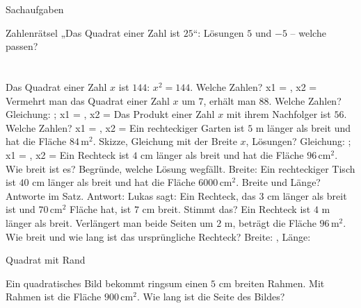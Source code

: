 \setcounter{aufgabe}{20}

\begin{aufgabe}{Sachaufgaben}
\begin{teile}
\teil Zahlenrätsel „Das Quadrat einer Zahl ist $25$“: Lösungen $5$ und $-5$ – welche passen?\\  \\  \\ 
\teil Das Quadrat einer Zahl $x$ ist $144$: $x^2 = 144$. Welche Zahlen? x1 = \leerfeld , x2 = \leerfeld
\teil Vermehrt man das Quadrat einer Zahl $x$ um $7$, erhält man $88$. Welche Zahlen? Gleichung: \leerfeld ; x1 = \leerfeld , x2 = \leerfeld
\teil Das Produkt einer Zahl $x$ mit ihrem Nachfolger ist $56$. Welche Zahlen? x1 = \leerfeld , x2 = \leerfeld
\teil Ein rechteckiger Garten ist $5$ m länger als breit und hat die Fläche $84\,\text{m}^2$. Skizze, Gleichung mit der Breite $x$, Lösungen? Gleichung: \leerfeld ; x1 = \leerfeld , x2 = \leerfeld
\teil Ein Rechteck ist $4$ cm länger als breit und hat die Fläche $96\,\text{cm}^2$. Wie breit ist es? Begründe, welche Lösung wegfällt. Breite: \leerfeld[cm]
\teil Ein rechteckiger Tisch ist $40$ cm länger als breit und hat die Fläche $6000\,\text{cm}^2$. Breite und Länge? Antworte im Satz. Antwort: \leerfeld
\teil Lukas sagt: Ein Rechteck, das $3$ cm länger als breit ist und $70\,\text{cm}^2$ Fläche hat, ist $7$ cm breit. Stimmt das? \janein
\teil Ein Rechteck ist $4$ m länger als breit. Verlängert man beide Seiten um $2$ m, beträgt die Fläche $96\,\text{m}^2$. Wie breit und wie lang ist das ursprüngliche Rechteck? Breite: \leerfeld[m] , Länge: \leerfeld[m]
\end{teile}
\end{aufgabe}

\begin{aufgabe}{Quadrat mit Rand}
\begin{teile}
\teil Ein quadratisches Bild bekommt ringsum einen $5$ cm breiten Rahmen. Mit Rahmen ist die Fläche $900\,\text{cm}^2$. Wie lang ist die Seite des Bildes? \leerfeld[cm]
\end{teile}
\end{aufgabe}

